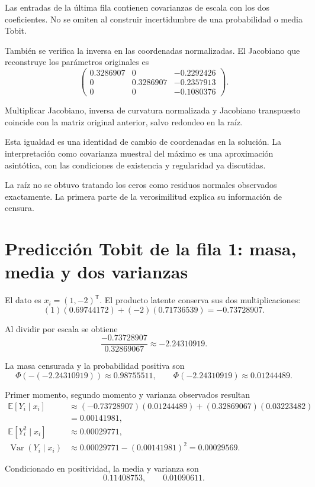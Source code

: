\documentclass[11pt,a4paper]{article}
\newcommand{\E}{\mathbb E}
\newcommand{\T}{^{\mathsf T}}
\DeclareMathOperator{\Var}{Var}
\begin{document}
Las entradas de la última fila
contienen covarianzas de escala
con los dos coeficientes.
No se omiten al construir
incertidumbre de una probabilidad
o media Tobit.

También se verifica la inversa
en las coordenadas normalizadas.
El Jacobiano que reconstruye
los parámetros originales es
\[
\begin{pmatrix}0.3286907&0&-0.2292426\\0&0.3286907&-0.2357913\\0&0&-0.1080376\end{pmatrix}.
\]

Multiplicar Jacobiano, inversa de
curvatura normalizada y Jacobiano
transpuesto coincide con la
matriz original anterior,
salvo redondeo en la raíz.

Esta igualdad es una identidad
de cambio de coordenadas
en la solución.
La interpretación como covarianza
muestral del máximo es
una aproximación asintótica,
con las condiciones de
existencia y regularidad ya discutidas.

La raíz no se obtuvo tratando
los ceros como residuos
normales observados exactamente.
La primera parte de la
verosimilitud explica su
información de censura.

\clearpage
\section{Predicción Tobit de la fila 1: masa, media y dos varianzas}\label{unidad114}
El dato es \(x_i=(1,-2)\T\).
El producto latente conserva
sus dos multiplicaciones:
\[
(1)(0.69744172)+(-2)(0.71736539)=-0.73728907.
\]

Al dividir por escala se obtiene
\[
\frac{-0.73728907}{0.32869067}\approx-2.24310919.
\]

La masa censurada y la
probabilidad positiva son
\[
\Phi(-(-2.24310919))\approx0.98755511,\qquad\Phi(-2.24310919)\approx0.01244489.
\]

Primer momento, segundo momento
y varianza observados resultan
\[
\begin{aligned}
\E[Y_i\mid x_i]&\approx(-0.73728907)(0.01244489)+(0.32869067)(0.03223482)\\
&=0.00141981,\\
\E[Y_i^2\mid x_i]&\approx0.00029771,\\
\Var(Y_i\mid x_i)&\approx0.00029771-(0.00141981)^2=0.00029569.\end{aligned}
\]

Condicionado en positividad,
la media y varianza son
\[
0.11408753,\qquad 0.01090611.
\]
\end{document}
